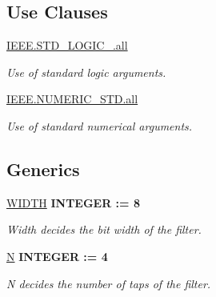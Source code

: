 \subsection*{Use Clauses}
 \begin{DoxyCompactItemize}
\item 
\hypertarget{classdigitalfilter_a68c233289eaf7d2601307bdd93b4c299}{\hyperlink{classdigitalfilter_a68c233289eaf7d2601307bdd93b4c299}{I\-E\-E\-E.\-S\-T\-D\-\_\-\-L\-O\-G\-I\-C\-\_.\-all}   }\label{classdigitalfilter_a68c233289eaf7d2601307bdd93b4c299}

\begin{DoxyCompactList}\small\item\em Use of standard logic arguments. \end{DoxyCompactList}\item 
\hypertarget{classdigitalfilter_a7c135c43c66ccd7f22abe5f6211788a5}{\hyperlink{classdigitalfilter_a7c135c43c66ccd7f22abe5f6211788a5}{I\-E\-E\-E.\-N\-U\-M\-E\-R\-I\-C\-\_\-\-S\-T\-D.\-all}   }\label{classdigitalfilter_a7c135c43c66ccd7f22abe5f6211788a5}

\begin{DoxyCompactList}\small\item\em Use of standard numerical arguments. \end{DoxyCompactList}\end{DoxyCompactItemize}
\subsection*{Generics}
 \begin{DoxyCompactItemize}
\item 
\hypertarget{classdigitalfilter_a91fcbc2cb8dd91f914c30526e23794a9}{\hyperlink{classdigitalfilter_a91fcbc2cb8dd91f914c30526e23794a9}{W\-I\-D\-T\-H} {\bfseries {\bfseries \textcolor{comment}{I\-N\-T\-E\-G\-E\-R}\textcolor{vhdlchar}{ }\textcolor{vhdlchar}{\-:}\textcolor{vhdlchar}{=}\textcolor{vhdlchar}{ } \textcolor{vhdldigit}{8} \textcolor{vhdlchar}{ }}}}\label{classdigitalfilter_a91fcbc2cb8dd91f914c30526e23794a9}

\begin{DoxyCompactList}\small\item\em Width decides the bit width of the filter. \end{DoxyCompactList}\item 
\hypertarget{classdigitalfilter_a61de7093f96d3bc9f246d1d7744f9dc6}{\hyperlink{classdigitalfilter_a61de7093f96d3bc9f246d1d7744f9dc6}{N} {\bfseries {\bfseries \textcolor{comment}{I\-N\-T\-E\-G\-E\-R}\textcolor{vhdlchar}{ }\textcolor{vhdlchar}{\-:}\textcolor{vhdlchar}{=}\textcolor{vhdlchar}{ } \textcolor{vhdldigit}{4} \textcolor{vhdlchar}{ }}}}\label{classdigitalfilter_a61de7093f96d3bc9f246d1d7744f9dc6}

\begin{DoxyCompactList}\small\item\em N decides the number of taps of the filter. \end{DoxyCompactList}\end{DoxyCompactItemize}
